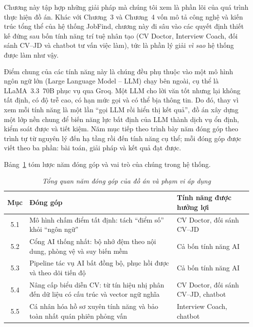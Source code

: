 \documentclass[../DoAn.tex]{subfiles}
\begin{document}

Chương này tập hợp những giải pháp mà chúng tôi xem là phần lõi của quá trình thực hiện đồ án. Khác với Chương~3 và Chương~4 vốn mô tả công nghệ và kiến trúc tổng thể của hệ thống JobFind, chương này đi sâu vào các quyết định thiết kế đứng sau bốn tính năng trí tuệ nhân tạo (CV Doctor, Interview Coach, đối sánh CV--JD và chatbot tư vấn việc làm), tức là phần lý giải \emph{vì sao} hệ thống được làm như vậy.

Điểm chung của các tính năng này là chúng đều phụ thuộc vào một mô hình ngôn ngữ lớn (Large Language Model -- LLM) chạy bên ngoài, cụ thể là LLaMA~3.3~70B phục vụ qua Groq. Một LLM cho lời văn tốt nhưng lại không tất định, có độ trễ cao, có hạn mức gọi và có thể bịa thông tin. Do đó, thay vì xem mỗi tính năng là một lần ``gọi LLM rồi hiển thị kết quả'', đồ án xây dựng một lớp nền chung để biến năng lực bất định của LLM thành dịch vụ ổn định, kiểm soát được và tiết kiệm. Năm mục tiếp theo trình bày năm đóng góp theo trình tự từ nguyên lý đến hạ tầng rồi đến tính năng cụ thể; mỗi đóng góp được viết theo ba phần: bài toán, giải pháp và kết quả đạt được.

Bảng~\ref{tab:ch5-tongquan} tóm lược năm đóng góp và vai trò của chúng trong hệ thống.

\begin{table}[ht]
\centering
\caption{\textit{Tổng quan năm đóng góp của đồ án và phạm vi áp dụng}}
\label{tab:ch5-tongquan}
\renewcommand{\arraystretch}{1.3}
\begin{tabular}{|c|p{5.2cm}|p{6.0cm}|}
\hline
\textbf{Mục} & \textbf{Đóng góp} & \textbf{Tính năng được hưởng lợi} \\ \hline
5.1 & Mô hình chấm điểm tất định: tách ``điểm số'' khỏi ``ngôn ngữ'' & CV Doctor, đối sánh CV--JD \\ \hline
5.2 & Cổng AI thống nhất: bộ nhớ đệm theo nội dung, phòng vệ và suy biến mềm & Cả bốn tính năng AI \\ \hline
5.3 & Pipeline tác vụ AI bất đồng bộ, phục hồi được và theo dõi tiến độ & Cả bốn tính năng AI \\ \hline
5.4 & Nâng cấp biểu diễn CV: từ tín hiệu nhị phân đến dữ liệu có cấu trúc và vector ngữ nghĩa & CV Doctor, đối sánh CV--JD, chatbot \\ \hline
5.5 & Cá nhân hóa hồ sơ xuyên tính năng và bảo toàn nhất quán phiên phỏng vấn & Interview Coach, chatbot \\ \hline
\end{tabular}
\end{table}
\end{document}
